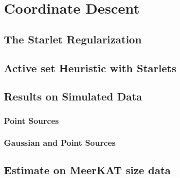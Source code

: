 \section{Coordinate Descent}

\subsection{The Starlet Regularization}

\subsection{Active set Heuristic with Starlets}

\subsection{Results on Simulated Data}

\subsubsection{Point Sources}

\subsubsection{Gaussian and Point Sources}

\subsection{Estimate on MeerKAT size data}